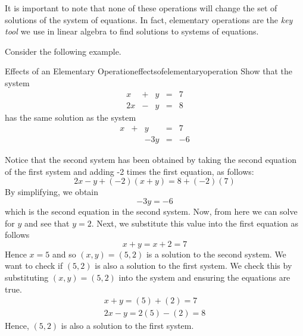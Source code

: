 It is important to note that none of these operations will 
change the set of solutions of the system of equations. In fact, elementary operations are the {\em key tool \em}we use in linear algebra to find solutions to systems of equations. 

Consider the following example.  

\begin{example}{Effects of an Elementary Operation}{effectsofelementaryoperation}
\label{example:effectsofelementaryoperation}
Show that the system 
\begin{equation*}
\begin{array}{cccccc}
x&+&y&=&7 \\
2x&-&y&=&8
\end{array}
\end{equation*}
has the same solution as the system 
\begin{equation*}
\begin{array}{cccccc}
x&+&y&=&7 \\
&&-3y&=&-6
\end{array}
\end{equation*}
\end{example}

\begin{solution}
Notice that the second system has been obtained by taking the second equation of the first system
and adding -2 times the first equation, as follows:
\begin{equation*}
2x-y + (-2)(x+y) = 8 + (-2)(7)
\end{equation*}
By simplifying, we obtain
\begin{equation*}
-3y=-6
\end{equation*}
which is the second equation in the second system.
Now, from here we can solve for $y$ and see that $y=2$. Next, we substitute this value into the first equation as follows \:
\begin{equation*}
x+y=x+2=7
\end{equation*}
Hence $x=5$ and so $\left( x,y\right) = \left(5,2 \right)$ is a solution to the second system.  
We want to check if $\left(5,2 \right)$ is also a solution to the first system. We check this by substituting $\left(x, y \right) = \left(5,2 \right)$
into the system and ensuring the equations are true.
\begin{equation*}
\begin{array}{c}
x+y = \left(5 \right)+ \left( 2 \right) = 7 \\
2x-y= 2 \left(5 \right) - \left( 2 \right) = 8
\end{array}
\end{equation*}
Hence, $\left(5,2 \right)$ is also a solution to the first system. 
\end{solution}

